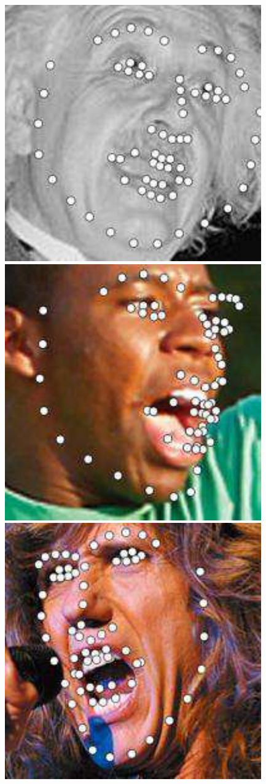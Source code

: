 \documentclass[journal]{IEEEtran}
\begin{document}
\begin{figure}[!htb]
\includegraphics[scale=0.22]{68_LBF_image_040}
\includegraphics[scale=0.22]{68_LBF_image_014_01}
\includegraphics[scale=0.22]{68_LBF_image_086_1}

\end{figure}
\end{document}
